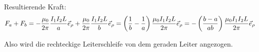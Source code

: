 \documentclass[sectionformat=aufgabe]{gadsescript}
\begin{document}
Resultierende Kraft:
\[
	F_a + F_b = 
	- \frac{ \mu_0 }{ 2 \pi  } \frac{ I_1 I_2L }{ a } \vec e_\rho \\
	+ \frac{ \mu_0 }{ 2 \pi  } \frac{ I_1 I_2L }{ b } \vec e_\rho \\
	= \left( \frac{ 1 }{ b } - \frac{ 1 }{ a }  \right) \frac{ \mu_0I_1I_2L }{ 2 \pi  } \vec e_\rho \\
	= - \left( \frac{ b - a }{ ab } \right) \frac{ \mu_0I_1I_2L }{ 2 \pi  } \vec e_\rho \\
\]

Also wird die rechteckige Leiterschleife von dem geraden Leiter angezogen.
\end{document}

